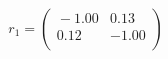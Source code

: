 \documentclass[10pt,a4paper]{article}
\begin{document}
 \begin{equation*} r_1  =  %
\begin{pmatrix}{}
  -1.00 & 0.13 \\ 
  0.12 & -1.00 \\ 
  \end{pmatrix}
 \end{equation*} 
\end{document}
